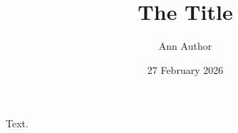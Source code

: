 \documentclass{tufte-handout}
\title{The Title}
\author{Ann Author}
\date{27 February 2026}
\begin{document}
\maketitle
Text.
\end{document}
